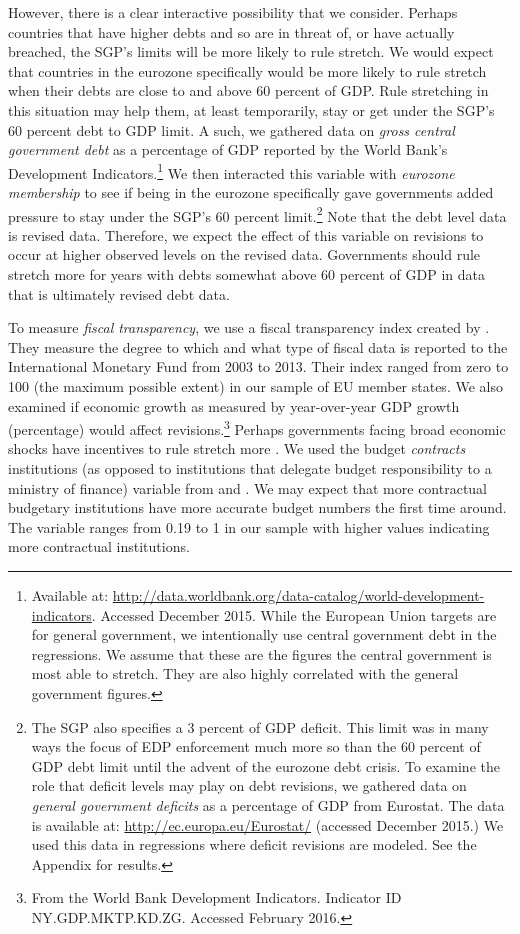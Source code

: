 \documentclass[]{article}
\begin{document}
However, there is a clear interactive possibility that we consider. Perhaps countries that have higher debts and so are in threat of, or have actually breached, the SGP's limits will be more likely to rule stretch. We would expect that countries in the eurozone specifically would be more likely to rule stretch when their debts are close to and above 60 percent of GDP. Rule stretching in this situation may help them, at least temporarily, stay or get under the SGP's 60 percent debt to GDP limit. A such, we gathered data on \emph{gross central government debt} as a percentage of GDP reported by the World Bank's Development Indicators.\footnote{Available at: \url{http://data.worldbank.org/data-catalog/world-development-indicators}. Accessed December 2015. While the European Union targets are for general government, we intentionally use central government debt in the regressions. We assume that these are the figures the central government is most able to stretch. They are also highly correlated with the general government figures.} We then interacted this variable with \emph{eurozone membership} to see if being in the eurozone specifically gave governments added pressure to stay under the SGP's 60 percent limit.\footnote{The SGP also specifies a 3 percent of GDP deficit. This limit was in many ways the focus of EDP enforcement much more so than the 60 percent of GDP debt limit until the advent of the eurozone debt crisis. To examine the role that deficit levels may play on debt revisions, we gathered data on \emph{general government deficits} as a percentage of GDP from Eurostat. The data is available at: \url{http://ec.europa.eu/Eurostat/} (accessed December 2015.) We used this data in regressions where deficit revisions are modeled. See the Appendix for results.} Note that the debt level data is revised data. Therefore, we expect the effect of this variable on revisions to occur at higher observed levels on the revised data. Governments should rule stretch more for years with debts somewhat above 60 percent of GDP in data that is ultimately revised debt data.

To measure \emph{fiscal transparency}, we use a fiscal transparency index created by \cite{Wang2015}. They measure the degree to which and what type of fiscal data is reported to the International Monetary Fund from 2003 to 2013. Their index ranged from zero to 100 (the maximum possible extent) in our sample of EU member states. We also examined if economic growth as measured by year-over-year GDP growth (percentage) would affect revisions.\footnote{From the World Bank Development Indicators. Indicator ID NY.GDP.MKTP.KD.ZG. Accessed February 2016.} Perhaps governments facing broad economic shocks have incentives to rule stretch more \citep{DeCastro2013}. We used the budget \emph{contracts} institutions (as opposed to institutions that delegate budget responsibility to a ministry of finance) variable from \cite{hallerberg2007design} and \cite{hallerbergstrauch2009}. We may expect that more contractual budgetary institutions have more accurate budget numbers the first time around. The variable ranges from 0.19 to 1 in our sample with higher values indicating more contractual institutions.
\end{document}

